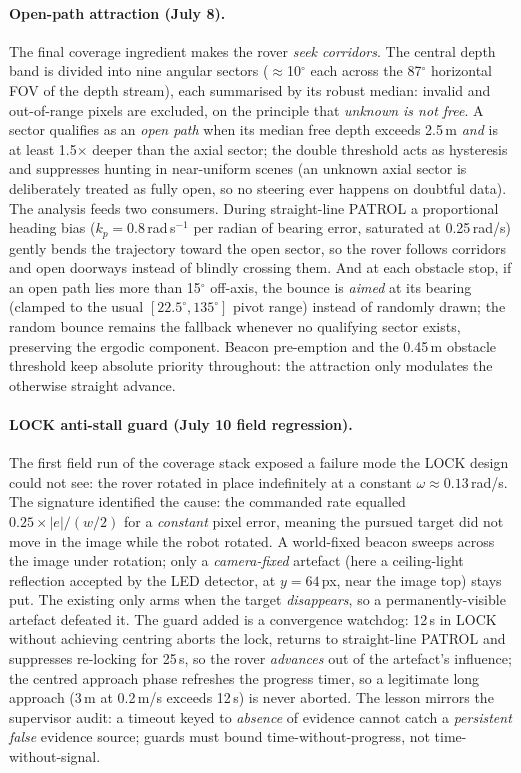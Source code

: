 \paragraph{Open-path attraction (July 8).} The final coverage ingredient
makes the rover \emph{seek corridors}. The central depth band is divided
into nine angular sectors ($\approx$10$^\circ$ each across the 87$^\circ$
horizontal FOV of the depth stream), each summarised by its robust median: invalid and out-of-range pixels are excluded, on the principle that
\emph{unknown is not free}. A sector qualifies as an \emph{open path} when
its median free depth exceeds 2.5\,m \emph{and} is at least 1.5$\times$
deeper than the axial sector; the double threshold acts as hysteresis and
suppresses hunting in near-uniform scenes (an unknown axial sector is
deliberately treated as fully open, so no steering ever happens on doubtful
data). The analysis feeds two consumers. During straight-line PATROL a
proportional heading bias ($k_p = 0.8$\,rad\,s$^{-1}$ per radian of bearing
error, saturated at 0.25\,rad/s) gently bends the trajectory toward the open
sector, so the rover follows corridors and open doorways instead of blindly
crossing them. And at each obstacle stop, if an open path lies more than
15$^\circ$ off-axis, the bounce is \emph{aimed} at its bearing (clamped to
the usual $[22.5^\circ, 135^\circ]$ pivot range) instead of randomly drawn;
the random bounce remains the fallback whenever no qualifying sector exists,
preserving the ergodic component. Beacon pre-emption and the 0.45\,m
obstacle threshold keep absolute priority throughout: the attraction only
modulates the otherwise straight advance.

\paragraph{LOCK anti-stall guard (July 10 field regression).} The first
field run of the coverage stack exposed a failure mode the LOCK design could
not see: the rover rotated in place indefinitely at a constant
$\omega \approx 0.13$\,rad/s. The signature identified the cause: the
commanded rate equalled $0.25 \times |e|/(w/2)$ for a \emph{constant} pixel
error, meaning the pursued target did not move in the image while the robot
rotated. A world-fixed beacon sweeps across the image under rotation; only a
\emph{camera-fixed} artefact (here a ceiling-light reflection accepted by the
LED detector, at $y=64$\,px, near the image top) stays put. The existing
 only arms when the target \emph{disappears}, so a
permanently-visible artefact defeated it. The guard added is a convergence
watchdog: 12\,s in LOCK without achieving centring aborts the lock, returns
to straight-line PATROL and suppresses re-locking for 25\,s, so the rover
\emph{advances} out of the artefact's influence; the centred approach phase
refreshes the progress timer, so a legitimate long approach (3\,m at
0.2\,m/s exceeds 12\,s) is never aborted. The lesson mirrors the supervisor
audit: a timeout keyed to \emph{absence} of evidence cannot catch a
\emph{persistent false} evidence source; guards must bound time-without-progress,
not time-without-signal.

